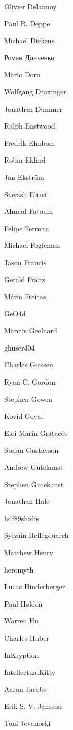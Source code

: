 \begin{DoxyItemize}
\item Olivier Delannoy
\item Paul R. Deppe
\item Michael Dickens
\item Роман Донченко
\item Mario Dorn
\item Wolfgang Draxinger
\item Jonathan Dummer
\item Ralph Eastwood
\item Fredrik Ehnbom
\item Robin Eklind
\item Jan Ekström
\item Siavash Eliasi
\item Ahmad Fatoum
\item Felipe Ferreira
\item Michael Fogleman
\item Jason Francis
\item Gerald Franz
\item Mário Freitas
\item Ge\+O4d
\item Marcus Geelnard
\item ghuser404
\item Charles Giessen
\item Ryan C. Gordon
\item Stephen Gowen
\item Kovid Goyal
\item Eloi Marín Gratacós
\item Stefan Gustavson
\item Andrew Gutekanst
\item Stephen Gutekanst
\item Jonathan Hale
\item hdf89shfdfs
\item Sylvain Hellegouarch
\item Matthew Henry
\item heromyth
\item Lucas Hinderberger
\item Paul Holden
\item Warren Hu
\item Charles Huber
\item In\+Kryption
\item Intellectual\+Kitty
\item Aaron Jacobs
\item Erik S. V. Jansson
\item Toni Jovanoski

\end{DoxyItemize}
